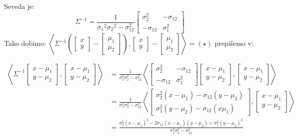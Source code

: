 \documentclass[12pt]{book}
\def\n{\noindent}
\theoremstyle{definition}
\theoremstyle{plain}
\theoremstyle{plain}
\theoremstyle{plain}
\theoremstyle{remark}
\begin{document}
\n Seveda je: 
$$
\Sigma^{-1}=\frac{1}{\sigma_1{ }^2 \sigma_2{ }^2-\sigma_{12}^2}\begin{bmatrix} \sigma_2^2 & -\sigma_{12} \\ -\sigma_{1 2} & \sigma_1^2 \end{bmatrix}
$$
Tako dobimo:  $\left\langle\Sigma^{-1}\left(\begin{bmatrix} x \\ y \end{bmatrix}-\begin{bmatrix} \mu_1 \\ \mu_2 \end{bmatrix}\right),\begin{bmatrix} x \\ y \end{bmatrix}-\begin{bmatrix} \mu_1 \\ \mu_2 \end{bmatrix}\right\rangle = (\star)$ prepišemo v: 

\begin{align*}
    \left\langle\Sigma^{-1}\begin{bmatrix} x - \mu_1 \\ y - \mu_2 \end{bmatrix},\begin{bmatrix} x - \mu_1 \\ y - \mu_2 \end{bmatrix}\right\rangle &= \frac{1}{\sigma_1^2 \sigma_2^2-\sigma_{12}^2} \left\langle \begin{bmatrix}\sigma_2^2 & -\sigma_{12} \\ -\sigma_{12} & \sigma_1^2 \end{bmatrix}\begin{bmatrix} x-\mu_1 \\ y-\mu_2 \end{bmatrix}, \begin{bmatrix} x-\mu_1 \\ y-\mu_2 \end{bmatrix}\right\rangle \\
    &= \frac{1}{\sigma_1^2 \sigma_2^2-\sigma_{12}^2} \left\langle \begin{bmatrix} \sigma_2^2\left(x-\mu_1\right)-\sigma_{12}\left(y-\mu_2\right) \\ \sigma_1^2\left(y-\mu_2\right)-\sigma_{12}\left(x \mu_1\right) \end{bmatrix}, \begin{bmatrix} x-\mu_1 \\ y-\mu_2 \end{bmatrix} \right\rangle \\
    &= \frac{\sigma_2^2\left(x-\mu_1\right)^2-2 \sigma_{12}\left(x-\mu_1\right)\left(y-\mu_2\right)+\sigma_1^2\left(y-\mu_2\right)^2}{\sigma_1^2 \sigma_2^2-\sigma_{12}^2}
\end{align*}
\end{document}
